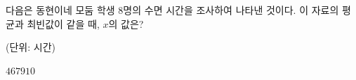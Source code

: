 다음은 동현이네 모둠 학생 $8$명의 수면 시간을 조사하여 나타낸 것이다. 이 자료의 평균과 최빈값이 같을 때, $x$의 값은?\par\noindent\hfill{\footnotesize (단위: 시간)}
\begin{choices32}{$4$}{$6$}{$7$}{$9$}{$10$}\end{choices32}
